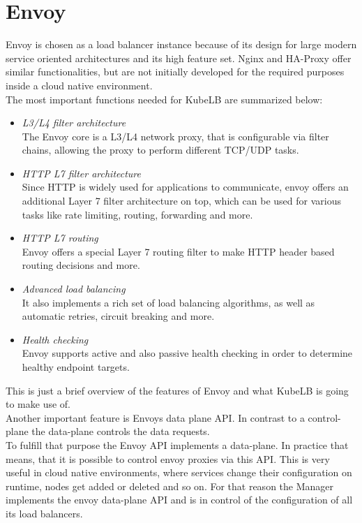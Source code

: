 \section{Envoy}\label{sec:envoy}

Envoy is chosen as a load balancer instance because of its design for large modern service oriented architectures and its high feature set.
Nginx and HA-Proxy offer similar functionalities, but are not initially developed for the required purposes inside a cloud native environment.
\\
The most important functions needed for KubeLB are summarized below:

\begin{itemize}
    \item \textit{L3/L4 filter architecture} \\
    The Envoy core is a L3/L4 network proxy, that is configurable via filter chains, allowing the proxy to perform different TCP/UDP tasks.
    \item \textit{HTTP L7 filter architecture} \\
    Since HTTP is widely used for applications to communicate, envoy offers an additional Layer 7 filter architecture on top, which can be used for various tasks like rate limiting, routing, forwarding and more.
    \item \textit{HTTP L7 routing} \\
    Envoy offers a special Layer 7 routing filter to make HTTP header based routing decisions and more.
    \item \textit{Advanced load balancing} \\
    It also implements a rich set of load balancing algorithms, as well as automatic retries, circuit breaking and more.
    \item \textit{Health checking} \\
    Envoy supports active and also passive health checking in order to determine healthy endpoint targets.
\end{itemize}

This is just a brief overview of the features of Envoy and what KubeLB is going to make use of.~\cite{WHAT-IS-ENVOY}
\\
Another important feature is Envoys data plane API.
In contrast to a control-plane the data-plane controls the data requests.
\\
To fulfill that purpose the Envoy API implements a data-plane.
In practice that means, that it is possible to control envoy proxies via this API.
This is very useful in cloud native environments, where services change their configuration on runtime, nodes get added or deleted and so on.
For that reason the Manager implements the envoy data-plane API and is in control of the configuration of all its load balancers.
